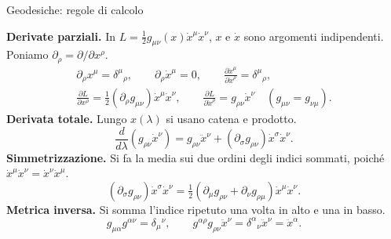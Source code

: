 \begin{frame}[t]{Geodesiche: regole di calcolo}
\small\raggedright
\textbf{Derivate parziali.} In \(L=\tfrac12 g_{\mu\nu}(x)\dot x^\mu\dot x^\nu\),
\(x\) e \(\dot x\) sono argomenti indipendenti. Poniamo
\(\partial_\rho=\partial/\partial x^\rho\).
\[
\begin{gathered}
  \partial_\rho x^\mu=\delta^\mu{}_{\rho},\qquad
  \partial_\rho\dot x^\mu=0,\qquad
  \frac{\partial\dot x^\mu}{\partial\dot x^\rho}=\delta^\mu{}_{\rho},\\[3pt]
  \frac{\partial L}{\partial x^\rho}
    =\tfrac12(\partial_\rho g_{\mu\nu})\dot x^\mu\dot x^\nu,\qquad
  \frac{\partial L}{\partial\dot x^\rho}=g_{\rho\nu}\dot x^\nu
  \quad (g_{\mu\nu}=g_{\nu\mu}).
\end{gathered}
\]
\textbf{Derivata totale.} Lungo \(x(\lambda)\) si usano catena e prodotto.
\[
\frac{d}{d\lambda}(g_{\rho\nu}\dot x^\nu)
=g_{\rho\nu}\ddot x^\nu
 +(\partial_\sigma g_{\rho\nu})\dot x^\sigma\dot x^\nu.
\]
\textbf{Simmetrizzazione.} Si fa la media sui due ordini degli indici sommati,
poiché \(\dot x^\mu\dot x^\nu=\dot x^\nu\dot x^\mu\).
\[
(\partial_\sigma g_{\rho\nu})\dot x^\sigma\dot x^\nu
=\tfrac12(\partial_\mu g_{\rho\nu}+\partial_\nu g_{\rho\mu})
  \dot x^\mu\dot x^\nu.
\]
\textbf{Metrica inversa.} Si somma l'indice ripetuto una volta in alto e una in basso.
\[
g_{\mu\alpha}g^{\alpha\nu}=\delta_\mu{}^\nu,\qquad
g^{\alpha\rho}g_{\rho\nu}\ddot x^\nu
  =\delta^\alpha{}_{\nu}\ddot x^\nu=\ddot x^\alpha.
\]
\end{frame}

